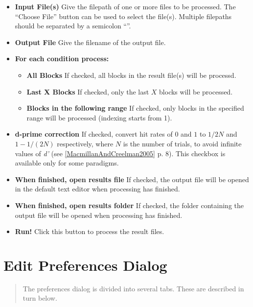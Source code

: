 \documentclass[a4paper,12pt,english]{sphinxmanual}
\begin{document}
\begin{itemize}
\item {} 
\textbf{Input File(s)} Give the filepath of one or more files to be
processed. The “Choose File” button can be used to select the
file(s). Multiple filepaths should be separated by a semicolon
“\code{;}”.

\item {} 
\textbf{Output File} Give the filename of the output file.

\item {} 
\textbf{For each condition process:}
\begin{itemize}
\item {} 
\textbf{All Blocks} If checked, all blocks in the result file(s) will
be processd.

\item {} 
\textbf{Last X Blocks} If checked, only the last $X$ blocks will
be processed.

\item {} 
\textbf{Blocks in the following range} If checked, only blocks in the
specified range will be processed (indexing starts from 1).

\end{itemize}

\item {} 
\textbf{d-prime correction} If checked, convert hit rates of $0$ and
$1$ to $1/2N$ and $1-1/(2N)$ respectively, where
$N$ is the number of trials, to avoid infinite values of \emph{d’}
(see {\hyperref[references:macmillanandcreelman2005]{{[}MacmillanAndCreelman2005{]}}} p. 8). This checkbox is available only for some
paradigms.

\item {} 
\textbf{When finished, open results file} If checked, the output file will
be opened in the default text editor when processing has finished.

\item {} 
\textbf{When finished, open results folder} If checked, the folder
containing the output file will be opened when processing has
finished.

\item {} 
\textbf{Run!} Click this button to process the result files.

\end{itemize}


\section{Edit Preferences Dialog}
\label{graphical_user_interface:sec-edit-preferences-dia}\label{graphical_user_interface:edit-preferences-dialog}\begin{quote}

The preferences dialog is divided into several tabs. These are described in turn below.
\end{quote}
\end{document}
